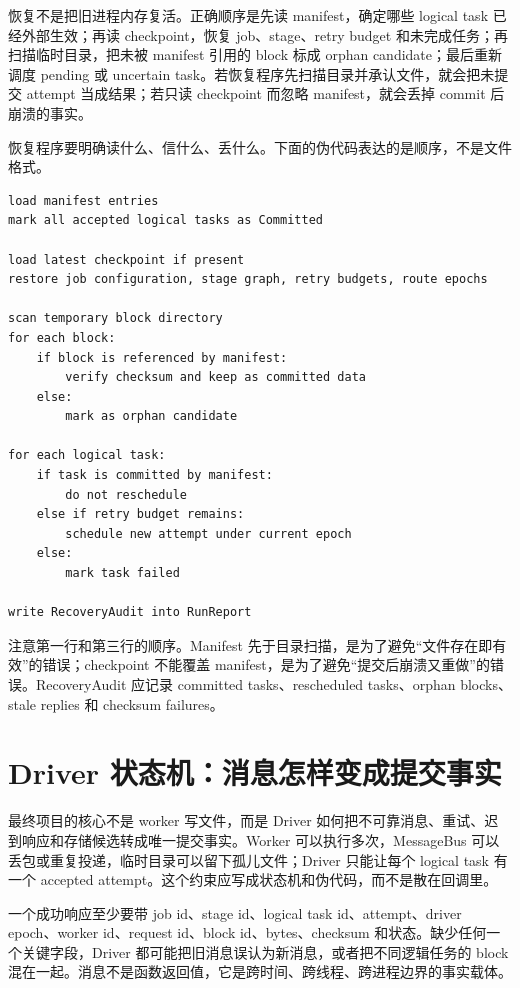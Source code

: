 恢复不是把旧进程内存复活。正确顺序是先读 manifest，确定哪些 logical task 已经外部生效；再读 checkpoint，恢复 job、stage、retry budget 和未完成任务；再扫描临时目录，把未被 manifest 引用的 block 标成 orphan candidate；最后重新调度 pending 或 uncertain task。若恢复程序先扫描目录并承认文件，就会把未提交 attempt 当成结果；若只读 checkpoint 而忽略 manifest，就会丢掉 commit 后崩溃的事实。

恢复程序要明确读什么、信什么、丢什么。下面的伪代码表达的是顺序，不是文件格式。

\begin{lstlisting}[numbers=none,caption={从 manifest 和 checkpoint 恢复控制面的伪代码}]
load manifest entries
mark all accepted logical tasks as Committed

load latest checkpoint if present
restore job configuration, stage graph, retry budgets, route epochs

scan temporary block directory
for each block:
    if block is referenced by manifest:
        verify checksum and keep as committed data
    else:
        mark as orphan candidate

for each logical task:
    if task is committed by manifest:
        do not reschedule
    else if retry budget remains:
        schedule new attempt under current epoch
    else:
        mark task failed

write RecoveryAudit into RunReport
\end{lstlisting}

注意第一行和第三行的顺序。Manifest 先于目录扫描，是为了避免“文件存在即有效”的错误；checkpoint 不能覆盖 manifest，是为了避免“提交后崩溃又重做”的错误。RecoveryAudit 应记录 committed tasks、rescheduled tasks、orphan blocks、stale replies 和 checksum failures。

\section{Driver 状态机：消息怎样变成提交事实}

最终项目的核心不是 worker 写文件，而是 Driver 如何把不可靠消息、重试、迟到响应和存储候选转成唯一提交事实。Worker 可以执行多次，MessageBus 可以丢包或重复投递，临时目录可以留下孤儿文件；Driver 只能让每个 logical task 有一个 accepted attempt。这个约束应写成状态机和伪代码，而不是散在回调里。

一个成功响应至少要带 job id、stage id、logical task id、attempt、driver epoch、worker id、request id、block id、bytes、checksum 和状态。缺少任何一个关键字段，Driver 都可能把旧消息误认为新消息，或者把不同逻辑任务的 block 混在一起。消息不是函数返回值，它是跨时间、跨线程、跨进程边界的事实载体。

